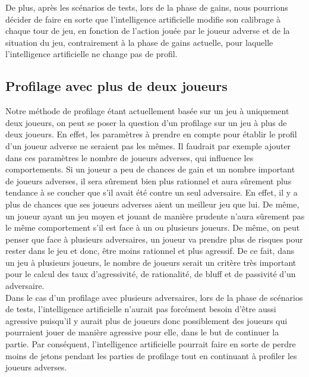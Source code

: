 \documentclass{report}
\begin{document}
De plus, après les scénarios de tests, lors de la phase de gains, nous pourrions décider de faire en sorte que l'intelligence artificielle modifie son calibrage à chaque tour de jeu, en fonction de l'action jouée par le joueur adverse et de la situation du jeu, contrairement à la phase de gains actuelle, pour laquelle l'intelligence artificielle ne change pas de profil.\par

\subsection{Profilage avec plus de deux joueurs}
\hspace{0.5cm}Notre méthode de profilage étant actuellement basée sur un jeu à uniquement deux joueurs, on peut se poser la question d'un profilage sur un jeu à plus de deux joueurs. En effet, les paramètres à prendre en compte pour établir le profil d'un joueur adverse ne seraient pas les mêmes. Il faudrait par exemple ajouter dans ces paramètres le nombre de joueurs adverses, qui influence les comportements. Si un joueur a peu de chances de gain et un nombre important de joueurs adverses, il sera sûrement bien plus rationnel et aura sûrement plus tendance à se coucher que s'il avait été contre un seul adversaire. En effet, il y a plus de chances que ses joueurs adverses aient un meilleur jeu que lui. De même, un joueur ayant un jeu moyen et jouant de manière prudente n'aura sûrement pas le même comportement s'il est face à un ou plusieurs joueurs. De même, on peut penser que face à plusieurs adversaires, un joueur va prendre plus de risques pour rester dans le jeu et donc, être moins rationnel et plus agressif. De ce fait, dans un jeu à plusieurs joueurs, le nombre de joueurs serait un critère très important pour le calcul des taux d'agressivité, de rationalité, de bluff et de passivité d'un adversaire. \\
Dans le cas d'un profilage avec plusieurs adversaires, lors de la phase de scénarios de tests, l'intelligence artificielle n'aurait pas forcément besoin d'être aussi agressive puisqu'il y aurait plus de joueurs donc possiblement des joueurs qui pourraient jouer de manière agressive pour elle, dans le but de continuer la partie. Par conséquent, l'intelligence artificielle pourrait faire en sorte de perdre moins de jetons pendant les parties de profilage tout en continuant à profiler les joueurs adverses.\par 
\end{document}
